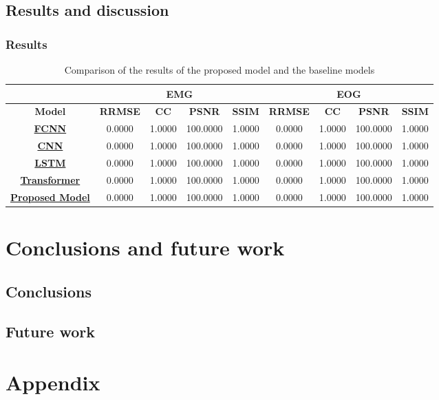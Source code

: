 \documentclass[a4paper]{sapthesis}
\begin{document}
\section{Results and discussion}
\subsection{Results}
\begin{table}[h!]
\centering
\caption{Comparison of the results of the proposed model and the baseline models}
\label{tab:rrmse}
\begin{tabular}{|c|c|c|c|c|c|c|c|c|}
\hline
\multicolumn{1}{|c|}{} & \multicolumn{4}{c|}{\textbf{EMG}} & \multicolumn{4}{c|}{\textbf{EOG}} \\ \cline{2-7}
\hline
\textbf{Model} & \textbf{RRMSE} & \textbf{CC} & \textbf{PSNR} & \textbf{SSIM} & \textbf{RRMSE} & \textbf{CC} & \textbf{PSNR} & \textbf{SSIM} \\ 
\hline
\textbf{\hyperref[sec:model_fcnn]{FCNN}} & 0.0000 & 1.0000 & 100.0000 & 1.0000 & 0.0000 & 1.0000 & 100.0000 & 1.0000 \\
\hline
\textbf{\hyperref[sec:model_cnn]{CNN}} & 0.0000 & 1.0000 & 100.0000 & 1.0000 & 0.0000 & 1.0000 & 100.0000 & 1.0000 \\
\hline
\textbf{\hyperref[sec:model_lstm]{LSTM}} & 0.0000 & 1.0000 & 100.0000 & 1.0000 & 0.0000 & 1.0000 & 100.0000 & 1.0000 \\
\hline
\textbf{\hyperref[sec:model_transformer]{Transformer}} & 0.0000 & 1.0000 & 100.0000 & 1.0000 & 0.0000 & 1.0000 & 100.0000 & 1.0000 \\
\hline
\textbf{\hyperref[sec:model_proposed]{Proposed Model}} & 0.0000 & 1.0000 & 100.0000 & 1.0000 & 0.0000 & 1.0000 & 100.0000 & 1.0000 \\
\hline
\end{tabular}
\end{table}

\chapter{Conclusions and future work}
\section{Conclusions}
\section{Future work}
\chapter{Appendix}
\end{document}
